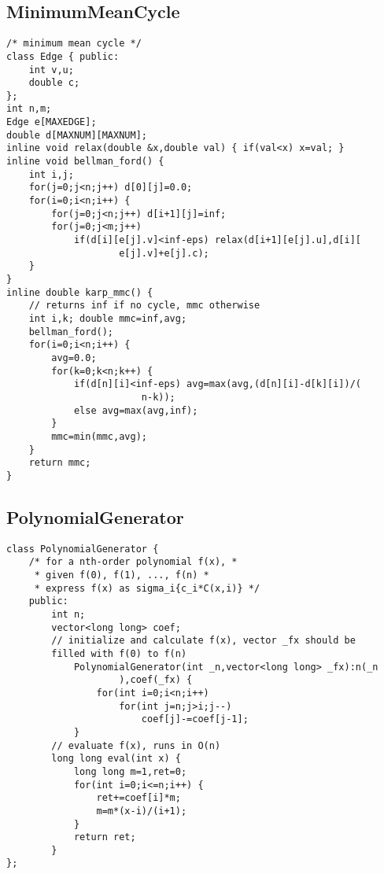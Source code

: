 \documentclass[10pt,twocolumn,oneside]{article}
\begin{document}
\subsection{MinimumMeanCycle}
\begin{lstlisting}
/* minimum mean cycle */
class Edge { public:
	int v,u;
	double c;
};
int n,m;
Edge e[MAXEDGE];
double d[MAXNUM][MAXNUM];
inline void relax(double &x,double val) { if(val<x) x=val; }
inline void bellman_ford() {
	int i,j;
	for(j=0;j<n;j++) d[0][j]=0.0;
	for(i=0;i<n;i++) {
		for(j=0;j<n;j++) d[i+1][j]=inf;
		for(j=0;j<m;j++)
			if(d[i][e[j].v]<inf-eps) relax(d[i+1][e[j].u],d[i][
					e[j].v]+e[j].c);
	}
}
inline double karp_mmc() {
	// returns inf if no cycle, mmc otherwise
	int i,k; double mmc=inf,avg;
	bellman_ford();
	for(i=0;i<n;i++) {
		avg=0.0;
		for(k=0;k<n;k++) {
			if(d[n][i]<inf-eps) avg=max(avg,(d[n][i]-d[k][i])/(
						n-k));
			else avg=max(avg,inf);
		}
		mmc=min(mmc,avg);
	}
	return mmc;
}
\end{lstlisting}

\subsection{PolynomialGenerator}
\begin{lstlisting}
class PolynomialGenerator {
	/* for a nth-order polynomial f(x), *
	 * given f(0), f(1), ..., f(n) *
	 * express f(x) as sigma_i{c_i*C(x,i)} */
	public:
		int n;
		vector<long long> coef;
		// initialize and calculate f(x), vector _fx should be
		filled with f(0) to f(n)
			PolynomialGenerator(int _n,vector<long long> _fx):n(_n
					),coef(_fx) {
				for(int i=0;i<n;i++)
					for(int j=n;j>i;j--)
						coef[j]-=coef[j-1];
			}
		// evaluate f(x), runs in O(n)
		long long eval(int x) {
			long long m=1,ret=0;
			for(int i=0;i<=n;i++) {
				ret+=coef[i]*m;
				m=m*(x-i)/(i+1);
			}
			return ret;
		}
};
\end{lstlisting}
\end{document}
